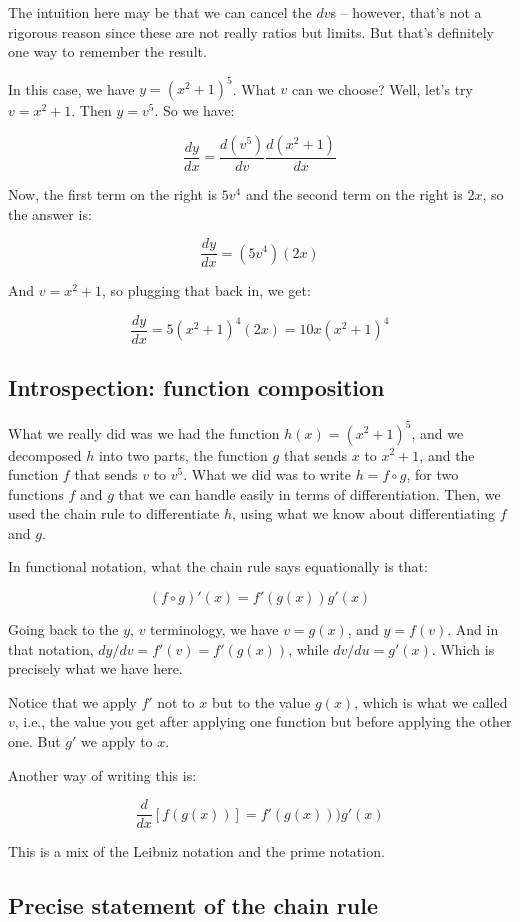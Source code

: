 \documentclass[10pt]{amsart}
\begin{document}
The intuition here may be that we can cancel the $dv$s -- however,
that's not a rigorous reason since these are not really ratios but
limits. But that's definitely one way to remember the result.

In this case, we have $y = (x^2 + 1)^5$. What $v$ can we choose? Well,
let's try $v = x^2 + 1$. Then $y = v^5$. So we have:

$$\frac{dy}{dx} = \frac{d(v^5)}{dv} \frac{d(x^2 + 1)}{dx}$$

Now, the first term on the right is $5v^4$ and the second term on the
right is $2x$, so the answer is:

$$\frac{dy}{dx} = (5v^4)(2x)$$

And $v = x^2 + 1$, so plugging that back in, we get:

$$\frac{dy}{dx} = 5(x^2 + 1)^4(2x) = 10x(x^2 + 1)^4$$

\subsection{Introspection: function composition}

What we really did was we had the function $h(x) = (x^2 + 1)^5$, and
we decomposed $h$ into two parts, the function $g$ that sends $x$ to
$x^2 + 1$, and the function $f$ that sends $v$ to $v^5$. What we did
was to write $h = f \circ g$, for two functions $f$ and $g$ that we
can handle easily in terms of differentiation. Then, we used the chain
rule to differentiate $h$, using what we know about differentiating
$f$ and $g$.

In functional notation, what the chain rule says equationally is that:

$$(f \circ g)'(x) = f'(g(x))g'(x)$$

Going back to the $y$, $v$ terminology, we have $v = g(x)$, and $y =
f(v)$. And in that notation, $dy/dv = f'(v) = f'(g(x))$, while $dv/du
= g'(x)$. Which is precisely what we have here.

Notice that we apply $f'$ not to $x$ but to the value $g(x)$, which is
what we called $v$, i.e., the value you get after applying one
function but before applying the other one. But $g'$ we apply to $x$.

Another way of writing this is:

$$\frac{d}{dx}\left[f(g(x))\right] = f'(g(x)))g'(x)$$

This is a mix of the Leibniz notation and the prime notation.

\subsection{Precise statement of the chain rule}
\end{document}
